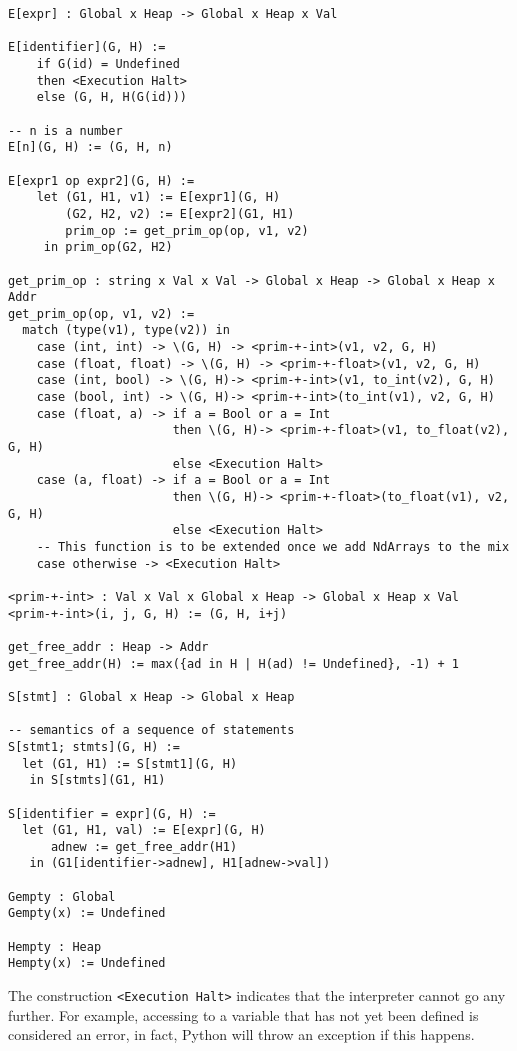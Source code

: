 \begin{verbatim}
E[expr] : Global x Heap -> Global x Heap x Val

E[identifier](G, H) :=
    if G(id) = Undefined
    then <Execution Halt>
    else (G, H, H(G(id)))

-- n is a number
E[n](G, H) := (G, H, n)

E[expr1 op expr2](G, H) :=
    let (G1, H1, v1) := E[expr1](G, H)
        (G2, H2, v2) := E[expr2](G1, H1)
        prim_op := get_prim_op(op, v1, v2)
     in prim_op(G2, H2)

get_prim_op : string x Val x Val -> Global x Heap -> Global x Heap x Addr
get_prim_op(op, v1, v2) :=
  match (type(v1), type(v2)) in
    case (int, int) -> \(G, H) -> <prim-+-int>(v1, v2, G, H)
    case (float, float) -> \(G, H) -> <prim-+-float>(v1, v2, G, H)
    case (int, bool) -> \(G, H)-> <prim-+-int>(v1, to_int(v2), G, H)
    case (bool, int) -> \(G, H)-> <prim-+-int>(to_int(v1), v2, G, H)
    case (float, a) -> if a = Bool or a = Int
                       then \(G, H)-> <prim-+-float>(v1, to_float(v2), G, H)
                       else <Execution Halt>
    case (a, float) -> if a = Bool or a = Int
                       then \(G, H)-> <prim-+-float>(to_float(v1), v2, G, H)
                       else <Execution Halt>
    -- This function is to be extended once we add NdArrays to the mix
    case otherwise -> <Execution Halt>

<prim-+-int> : Val x Val x Global x Heap -> Global x Heap x Val
<prim-+-int>(i, j, G, H) := (G, H, i+j)

get_free_addr : Heap -> Addr
get_free_addr(H) := max({ad in H | H(ad) != Undefined}, -1) + 1

S[stmt] : Global x Heap -> Global x Heap

-- semantics of a sequence of statements
S[stmt1; stmts](G, H) :=
  let (G1, H1) := S[stmt1](G, H)
   in S[stmts](G1, H1)

S[identifier = expr](G, H) :=
  let (G1, H1, val) := E[expr](G, H)
      adnew := get_free_addr(H1)
   in (G1[identifier->adnew], H1[adnew->val])

Gempty : Global
Gempty(x) := Undefined

Hempty : Heap
Hempty(x) := Undefined
\end{verbatim}

The construction \verb+<Execution Halt>+ indicates that the interpreter cannot go any
further. For example, accessing to a variable that has not yet been defined is considered
an error, in fact, Python will throw an exception if this happens.


